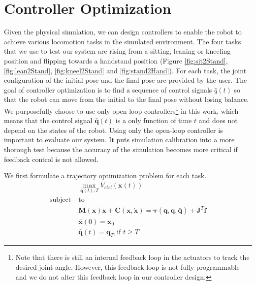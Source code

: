 \section{Controller Optimization}

Given the physical simulation, we can design controllers to enable the robot to achieve various locomotion tasks in the simulated environment. The four tasks that we use to test our system are rising from a sitting, leaning or kneeling position and flipping towards a handstand position (Figure \ref{fig:sit2Stand}, \ref{fig:lean2Stand}, \ref{fig:kneel2Stand} and \ref{fig:stand2Hand}). For each task, the joint configuration of the initial pose and the final pose are provided by the user. The goal of controller optimization is to find a sequence of control signals $\bar{q}(t)$ so that the robot can move from the initial to the final pose without losing balance. We purposefully choose to use only open-loop controllers\footnote{Note that there is still an internal feedback loop in the actuators to track the desired joint angle. However, this feedback loop is not fully programmable and we do not alter this feedback loop in our controller design.} in this work, which means that the control signal $\bar{\mathbf{q}}(t)$ is a only function of time $t$ and does not depend on the states of the robot. Using only the open-loop controller is important to evaluate our system. It puts simulation calibration into a more thorough test because the accuracy of the simulation becomes more critical if feedback control is not allowed.

We first formulate a trajectory optimization problem for each task.
\begin{align}
 \label{eqn:obj}&\max_{\bar{\mathbf{q}}(t),T} V_{ctrl}(\mathbf{x}(t))\\
\nonumber  \mathrm{subject\;} &\mathrm{to} \\
\label{eqn:dyn1} & \mathbf{M}(\mathbf{x})\mathbf{\ddot{x}}+\mathbf{C}(\mathbf{x},\mathbf{\dot{x}}) =\boldsymbol{\tau}(\mathbf{q}, \dot{\mathbf{q}}, \bar{\mathbf{q}}) + \mathbf{J}^T\mathbf{f}\\
\label{eqn:boundary1}&\bar{\mathbf{x}}(0) = \mathbf{x}_0\\
\label{eqn:boundary2}&\bar{\mathbf{q}}(t) = \mathbf{q}_T, \text{if } t \geq T
\end{align}

